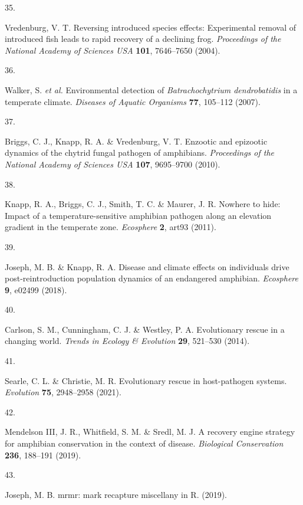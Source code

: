 \documentclass[
  letterpaper,
  DIV=11,
  numbers=noendperiod]{scrartcl}
\newlength{\cslhangindent}
\newlength{\csllabelwidth}
\newenvironment{CSLReferences}[2] %
 {\begin{list}{}{%
  \setlength{\itemindent}{0pt}
  \setlength{\leftmargin}{0pt}
  \setlength{\parsep}{0pt}
  \ifodd #1
   \setlength{\leftmargin}{\cslhangindent}
   \setlength{\itemindent}{-1\cslhangindent}
  \fi
  \setlength{\itemsep}{#2\baselineskip}}}
 {\end{list}}
\newcommand{\CSLLeftMargin}[1]{\parbox[t]{\csllabelwidth}{\strut#1\strut}}
\newcommand{\CSLRightInline}[1]{\parbox[t]{\linewidth - \csllabelwidth}{\strut#1\strut}}
\begin{document}
\begin{CSLReferences}{0}{0}
\CSLLeftMargin{35. }%
\CSLRightInline{Vredenburg, V. T. Reversing introduced species effects:
Experimental removal of introduced fish leads to rapid recovery of a
declining frog. \emph{Proceedings of the National Academy of Sciences
USA} \textbf{101}, 7646--7650 (2004).}

\CSLLeftMargin{36. }%
\CSLRightInline{Walker, S. \emph{et al.} Environmental detection of
\emph{{B}atrachochytrium dendrobatidis} in a temperate climate.
\emph{Diseases of Aquatic Organisms} \textbf{77}, 105--112 (2007).}

\CSLLeftMargin{37. }%
\CSLRightInline{Briggs, C. J., Knapp, R. A. \& Vredenburg, V. T.
Enzootic and epizootic dynamics of the chytrid fungal pathogen of
amphibians. \emph{Proceedings of the National Academy of Sciences USA}
\textbf{107}, 9695--9700 (2010).}

\CSLLeftMargin{38. }%
\CSLRightInline{Knapp, R. A., Briggs, C. J., Smith, T. C. \& Maurer, J.
R. Nowhere to hide: Impact of a temperature-sensitive amphibian pathogen
along an elevation gradient in the temperate zone. \emph{Ecosphere}
\textbf{2}, art93 (2011).}

\CSLLeftMargin{39. }%
\CSLRightInline{Joseph, M. B. \& Knapp, R. A. Disease and climate
effects on individuals drive post{-}reintroduction population dynamics
of an endangered amphibian. \emph{Ecosphere} \textbf{9}, e02499 (2018).}

\CSLLeftMargin{40. }%
\CSLRightInline{Carlson, S. M., Cunningham, C. J. \& Westley, P. A.
Evolutionary rescue in a changing world. \emph{Trends in Ecology \&
Evolution} \textbf{29}, 521--530 (2014).}

\CSLLeftMargin{41. }%
\CSLRightInline{Searle, C. L. \& Christie, M. R. Evolutionary rescue in
host-pathogen systems. \emph{Evolution} \textbf{75}, 2948--2958 (2021).}

\CSLLeftMargin{42. }%
\CSLRightInline{Mendelson III, J. R., Whitfield, S. M. \& Sredl, M. J.
{A recovery engine strategy for amphibian conservation in the context of
disease}. \emph{Biological Conservation} \textbf{236}, 188--191 (2019).}

\CSLLeftMargin{43. }%
\CSLRightInline{Joseph, M. B. {mrmr: mark recapture miscellany in R}.
(2019).}


\end{CSLReferences}
\end{document}
